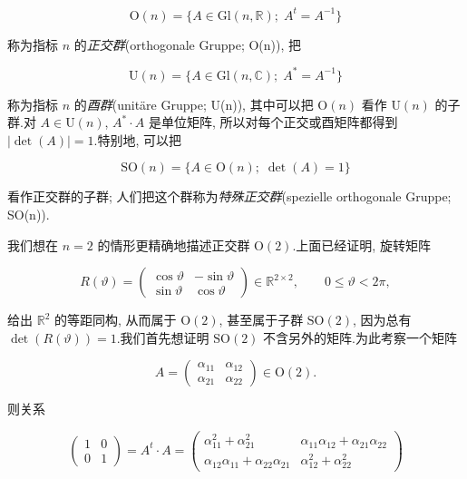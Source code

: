\[
\mathrm{O}(n) = \bigl\{A \in \mathrm{Gl}(n, \mathbb{R});\; A^t = A^{-1}\bigr\}
\]

称为指标 $n$ 的\emph{正交群}(\textup{orthogonale Gruppe; O(n)}), 把

\[
\mathrm{U}(n) = \bigl\{A \in \mathrm{Gl}(n, \mathbb{C});\; A^* = A^{-1}\bigr\}
\]

称为指标 $n$ 的\emph{酉群}(\textup{unitäre Gruppe; U(n)}), 其中可以把 $\mathrm{O}(n)$ 看作 $\mathrm{U}(n)$ 的子群.对 $A \in \mathrm{U}(n)$, $A^* \cdot A$ 是单位矩阵, 所以对每个正交或酉矩阵都得到 $|\det(A)| = 1$.特别地, 可以把

\[
\mathrm{SO}(n) = \bigl\{A \in \mathrm{O}(n);\; \det(A) = 1\bigr\}
\]

看作正交群的子群; 人们把这个群称为\emph{特殊正交群}(\textup{spezielle orthogonale Gruppe; SO(n)}).

我们想在 $n = 2$ 的情形更精确地描述正交群 $\mathrm{O}(2)$.上面已经证明, 旋转矩阵

\[
R(\vartheta) = \begin{pmatrix} \cos \vartheta & -\sin \vartheta \\ \sin \vartheta & \cos \vartheta \end{pmatrix} \in \mathbb{R}^{2 \times 2}, \qquad 0 \leq \vartheta < 2\pi,
\]

给出 $\mathbb{R}^2$ 的等距同构, 从而属于 $\mathrm{O}(2)$, 甚至属于子群 $\mathrm{SO}(2)$, 因为总有 $\det(R(\vartheta)) = 1$.我们首先想证明 $\mathrm{SO}(2)$ 不含另外的矩阵.为此考察一个矩阵

\[
A = \begin{pmatrix} \alpha_{11} & \alpha_{12} \\ \alpha_{21} & \alpha_{22} \end{pmatrix} \in \mathrm{O}(2)\text{.}
\]

则关系

\[
\begin{pmatrix} 1 & 0 \\ 0 & 1 \end{pmatrix} = A^t \cdot A = \begin{pmatrix} \alpha_{11}^2 + \alpha_{21}^2 & \alpha_{11}\alpha_{12} + \alpha_{21}\alpha_{22} \\ \alpha_{12}\alpha_{11} + \alpha_{22}\alpha_{21} & \alpha_{12}^2 + \alpha_{22}^2 \end{pmatrix}
\]


